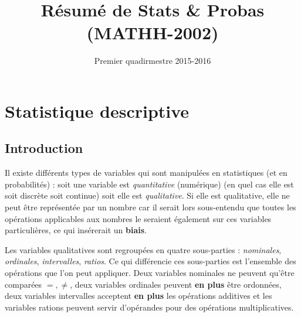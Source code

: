\documentclass{article}
\title{Résumé de Stats \& Probas (MATHH-2002)}
\date{Premier quadirmestre 2015-2016}
\author{}
\begin{document}
\maketitle
\tableofcontents
\newpage
{}

\section{Statistique descriptive}
	\subsection{Introduction}
		Il existe différents types de variables qui sont manipulées en statistiques (et en probabilités) : soit une variable est \textit{quantitative} (numérique) (en
		quel cas elle est soit discrète soit continue) soit elle est \textit{qualitative}. Si elle est qualitative, elle ne peut être représentée par un nombre car il
		serait lors sous-entendu que toutes les opérations applicables aux nombres le seraient également sur ces variables particulières, ce qui insérerait un
		\textbf{biais}.

		Les variables qualitatives sont regroupées en quatre sous-parties : \textit{nominales}, \textit{ordinales}, \textit{intervalles}, \textit{ratios}. Ce qui
		différencie ces sous-parties est l'ensemble des opérations que l'on peut appliquer. Deux variables nominales ne peuvent qu'être comparées $=,\neq$, deux
		variables ordinales peuvent \textbf{en plus} être ordonnées, deux variables intervalles acceptent \textbf{en plus} les opérations additives et les variables
		rations peuvent servir d'opérandes pour des opérations multiplicatives.
\end{document}
